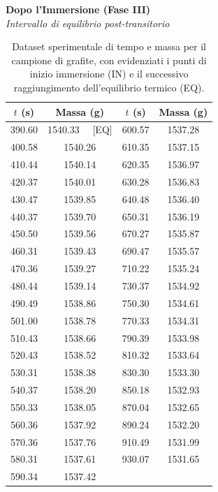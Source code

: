 \documentclass[a4paper,12pt]{article}
\begin{document}
\begin{table}[htbp]
    \hfill
    \begin{minipage}[t]{0.58\textwidth}
        \centering
        \textbf{Dopo l'Immersione (Fase III)} \\
        \textit{Intervallo di equilibrio post-transitorio} \\
        \vspace{0.3cm}
        \begin{tabular}{cc|cc}
            \hline
            $t$ (s) & Massa (g) & $t$ (s) & Massa (g) \\ \hline
            390.60 & 1540.33 \ \ [EQ] & 600.57 & 1537.28 \\
            400.58 & 1540.26 & 610.35 & 1537.15 \\
            410.44 & 1540.14 & 620.35 & 1536.97 \\
            420.37 & 1540.01 & 630.28 & 1536.83 \\
            430.47 & 1539.85 & 640.48 & 1536.40 \\
            440.37 & 1539.70 & 650.31 & 1536.19 \\
            450.50 & 1539.56 & 670.27 & 1535.87 \\
            460.31 & 1539.43 & 690.47 & 1535.57 \\
            470.36 & 1539.27 & 710.22 & 1535.24 \\
            480.44 & 1539.14 & 730.37 & 1534.92 \\
            490.49 & 1538.86 & 750.30 & 1534.61 \\
            501.00 & 1538.78 & 770.33 & 1534.31 \\
            510.43 & 1538.66 & 790.39 & 1533.98 \\
            520.43 & 1538.52 & 810.32 & 1533.64 \\
            530.31 & 1538.38 & 830.30 & 1533.30 \\
            540.37 & 1538.20 & 850.18 & 1532.93 \\
            550.33 & 1538.05 & 870.04 & 1532.65 \\
            560.36 & 1537.92 & 890.24 & 1532.20 \\
            570.36 & 1537.76 & 910.49 & 1531.99 \\
            580.31 & 1537.61 & 930.07 & 1531.65 \\
            590.34 & 1537.42 & & \\ \hline
        \end{tabular}
    \end{minipage}
    \caption{Dataset sperimentale di tempo e massa per il campione di grafite, con evidenziati i punti di inizio immersione (IN) e il successivo raggiungimento dell'equilibrio termico (EQ).}
    \label{tab:dati_grafite}
\end{table}
\end{document}
